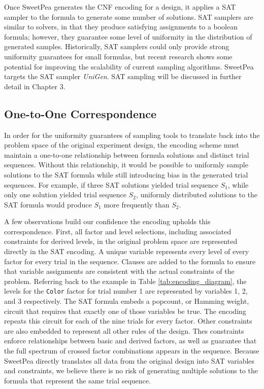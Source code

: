 Once SweetPea generates the CNF encoding for a design, it applies a SAT sampler to the formula to generate some number of solutions. SAT samplers are similar to solvers, in that they produce satisfying assignments to a boolean formula; however, they guarantee some level of uniformity in the distribution of generated samples. Historically, SAT samplers could only provide strong uniformity guarantees for small formulas, but recent research shows some potential for improving the scalability of current sampling algorithms. SweetPea targets the SAT sampler \textit{UniGen}. SAT sampling will be discussed in further detail in Chapter 3.

\subsection{One-to-One Correspondence}

In order for the uniformity guarantees of sampling tools to translate back into the problem space of the original experiment design, the encoding scheme must maintain a one-to-one relationship between formula solutions and distinct trial sequences. Without this relationship, it would be possible to uniformly sample solutions to the SAT formula while still introducing bias in the generated trial sequences. For example, if three SAT solutions yielded trial sequence $S_1$, while only one solution yielded trial sequence $S_2$, uniformly distributed solutions to the SAT formula would produce $S_1$ more frequently than $S_2$.

A few observations build our confidence the encoding upholds this correspondence. First, all factor and level selections, including associated constraints for derived levels, in the original problem space are represented directly in the SAT encoding. A unique variable represents every level of every factor for every trial in the sequence. Clauses are added to the formula to ensure that variable assignments are consistent with the actual constraints of the problem. Referring back to the example in Table \ref{tab:encoding_diagram}, the levels for the \texttt{Color} factor for trial number 1 are represented by variables 1, 2, and 3 respectively. The SAT formula embeds a popcount, or Hamming weight, circuit that requires that exactly one of those variables be true. The encoding repeats this circuit for each of the nine trials for every factor. Other constraints are also embedded to represent all other rules of the design. Thes constraints enforce relationships between basic and derived factors, as well as guarantee that the full spectrum of crossed factor combinations appears in the sequence. Because SweetPea directly translates all data from the original design into SAT variables and constraints, we believe there is no risk of generating multiple solutions to the formula that represent the same trial sequence.

